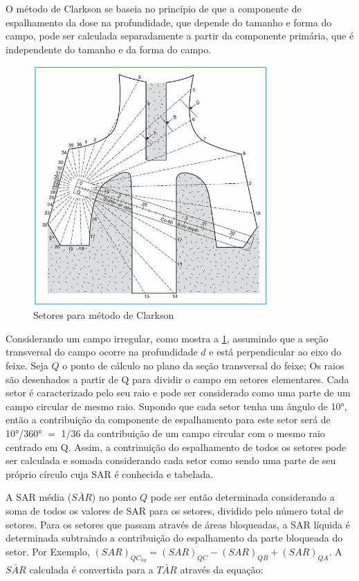 \documentclass[11pt,a4paper]{article}
\begin{document}
	O método de Clarkson se baseia no princípio de que a componente de espalhamento da dose na profundidade, que depende do tamanho e forma do campo, pode ser calculada separadamente a partir da componente primária, que é independente do tamanho e da forma do campo. 


	\begin{figure}[h]
		\centering
		\includegraphics[width=0.8\textwidth]{Imagens/clarkson.JPG}
		\caption{Setores para método de Clarkson}
		\label{fig:clarkson}                
	\end{figure}

	Considerando um campo irregular, como mostra a \ref{fig:clarkson}, assumindo que a seção transversal do campo ocorre na profundidade $d$ e está perpendicular ao eixo do feixe. Seja $Q$ o ponto de cálculo no plano da seção transversal do feixe; Os raios são desenhados a partir de Q para dividir o campo em setores elementares. Cada setor é caracterizado pelo seu raio e pode ser considerado como uma parte de um campo circular de mesmo raio. Supondo que cada setor tenha um ângulo de \ang{10}, então a contribuição da componente de espalhamento para este setor será de \ang{10}/\ang{360} $=$ 1/36 da contribuição de um campo circular com o mesmo raio centrado em Q. Assim, a contrinuição do espalhamento de todos os setores pode ser calculada e somada considerando cada setor como sendo uma parte de seu próprio círculo cuja SAR é conhecida e tabelada. 

	A SAR média ($\bar{SAR}$) no ponto $Q$  pode ser então determinada considerando a soma de todos os valores de SAR para os setores, dividido pelo número total de setores. Para os setores que passam através de áreas bloqueadas, a SAR líquida é determinada subtraindo a contribuição do espalhamento da parte bloqueada do setor. Por Exemplo, $(SAR)_{QC_{liq}} = (SAR)_{QC} - (SAR)_{QB} + (SAR)_{QA}$. A $\bar{SAR}$ calculada é convertida para a $\bar{TAR}$ através da equação:
\end{document}

